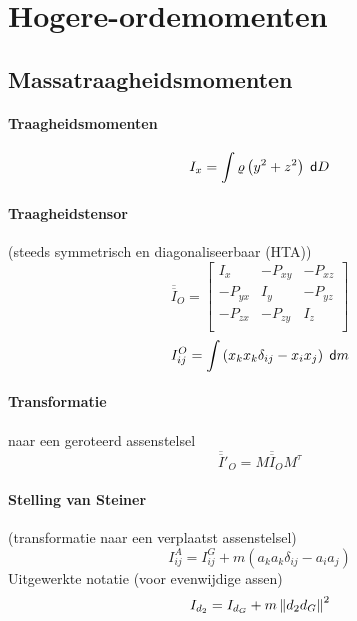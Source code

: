 \newpage
\section{Hogere-ordemomenten}

\subsection{Massatraagheidsmomenten}

\paragraph{Traagheidsmomenten}
\[
  I_x = \int \varrho \left( y^2 + z^2 \right) \;\textsf{d}D
\]

\paragraph{Traagheidstensor} (steeds symmetrisch en diagonaliseerbaar (HTA))
\[
  \overline{\overline{I}}_O =
  \left[
    \begin{array}{ccc}
      I_x & - P_{xy} & - P_{xz}\\
      - P_{yx} & I_y & - P_{yz}\\
      - P_{zx} & - P_{zy} & I_z\\
    \end{array}
  \right]
\]
\[
  I^O_{ij} = \int\left( x_k x_k \delta_{ij} - x_{i} x_{j} \right) \;\textsf{d}m
\]

\paragraph{Transformatie} naar een geroteerd assenstelsel
\[
  \overline{\overline{I}}'_O = M \overline{\overline{I}}_O M^{\tau}
\]

\paragraph{Stelling van Steiner} (transformatie naar een verplaatst assenstelsel)
\[
  I^A_{ij} = I^G_{ij} + m \left(a_ka_k \delta_{ij} - a_i a_j\right)
\]
Uitgewerkte notatie (voor evenwijdige assen)
\[
  I_{d_2} = I_{d_G} + m \left\| d_2d_G \right\|^2
\]
